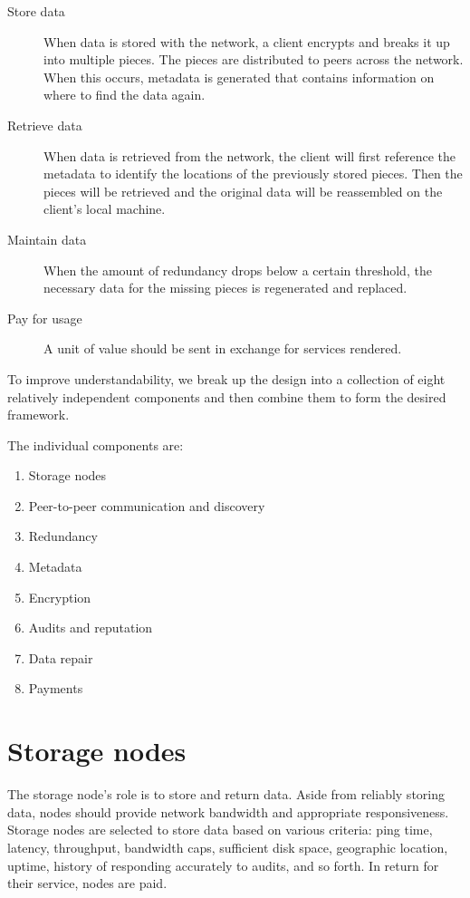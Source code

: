 \documentclass[8pt,fleqn,openany]{book}
\begin{document}
\begin{description}

\item[Store data] When data is stored with the network, a client encrypts
and breaks it up into multiple pieces. The pieces are distributed
to peers across the network. When this occurs, metadata is generated that
contains information on where to find the data again.

\item[Retrieve data] When data is retrieved from the network,
the client will first reference the metadata to identify the locations of the
previously stored pieces.
Then the pieces will be retrieved and the original data will be reassembled
on the client's local machine.

\item[Maintain data] When the amount of redundancy drops below a certain
threshold, the necessary data for the missing pieces is regenerated and
replaced.

\item[Pay for usage] A unit of value should be sent in exchange for
services rendered.

\end{description}

To improve understandability, we break up the design into a collection of eight
relatively independent components and then combine them to form the desired
framework.

The individual components are:

\begin{enumerate}
\item Storage nodes
\item Peer-to-peer communication and discovery
\item Redundancy
\item Metadata
\item Encryption
\item Audits and reputation
\item Data repair
\item Payments
\end{enumerate}

\section{Storage nodes}

The storage node's role is to store and return data.
Aside from reliably storing data, nodes should provide
network bandwidth and appropriate responsiveness.
Storage nodes are selected to store data based on various criteria: ping time,
latency, throughput, bandwidth caps, sufficient disk space,
geographic location, uptime, history of responding accurately to audits, and
so forth. In return for their service, nodes are paid.
\end{document}
